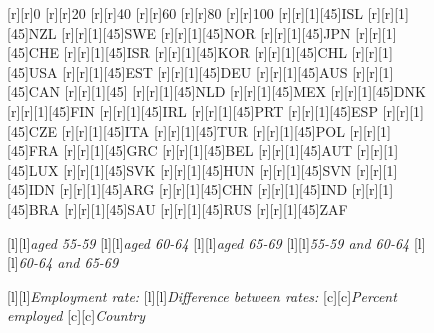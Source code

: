 \documentclass[11 pt, a4paper]{report}
\begin{document}
\begin{figure}[hbtp!]
[r][r]{\scriptsize{0}}
[r][r]{\scriptsize{20}}
[r][r]{\scriptsize{40}}
[r][r]{\scriptsize{60}}
[r][r]{\scriptsize{80}}
[r][r]{\scriptsize{100}}
[r][r][1][45]{\tiny{ISL}}
[r][r][1][45]{\tiny{NZL}}
[r][r][1][45]{\tiny{SWE}}
[r][r][1][45]{\tiny{NOR}}
[r][r][1][45]{\tiny{JPN}}
[r][r][1][45]{\tiny{CHE}}
[r][r][1][45]{\tiny{ISR}}
[r][r][1][45]{\tiny{KOR}}
[r][r][1][45]{\tiny{CHL}}
[r][r][1][45]{\tiny{USA}}
[r][r][1][45]{\tiny{EST}}
[r][r][1][45]{\tiny{DEU}}
[r][r][1][45]{\tiny{AUS}}
[r][r][1][45]{\tiny{CAN}}
[r][r][1][45]{\tiny{\color{red}{GBR}}}
[r][r][1][45]{\tiny{NLD}}
[r][r][1][45]{\tiny{MEX}}
[r][r][1][45]{\tiny{DNK}}
[r][r][1][45]{\tiny{FIN}}
[r][r][1][45]{\tiny{IRL}}
[r][r][1][45]{\tiny{PRT}}
[r][r][1][45]{\tiny{ESP}}
[r][r][1][45]{\tiny{CZE}}
[r][r][1][45]{\tiny{ITA}}
[r][r][1][45]{\tiny{TUR}}
[r][r][1][45]{\tiny{POL}}
[r][r][1][45]{\tiny{FRA}}
[r][r][1][45]{\tiny{GRC}}
[r][r][1][45]{\tiny{BEL}}
[r][r][1][45]{\tiny{AUT}}
[r][r][1][45]{\tiny{LUX}}
[r][r][1][45]{\tiny{SVK}}
[r][r][1][45]{\tiny{HUN}}
[r][r][1][45]{\tiny{SVN}}
[r][r][1][45]{\tiny{IDN}}
[r][r][1][45]{\tiny{ARG}}
[r][r][1][45]{\tiny{CHN}}
[r][r][1][45]{\tiny{IND}}
[r][r][1][45]{\tiny{BRA}}
[r][r][1][45]{\tiny{SAU}}
[r][r][1][45]{\tiny{RUS}}
[r][r][1][45]{\tiny{ZAF}}

[l][l]{\scriptsize{\emph{aged 55-59}}}
[l][l]{\scriptsize{\emph{aged 60-64}}}
[l][l]{\scriptsize{\emph{aged 65-69}}}
[l][l]{\scriptsize{\emph{55-59 and 60-64}}}
[l][l]{\scriptsize{\emph{60-64 and 65-69}}}

[l][l]{\scriptsize{\emph{Employment rate:}}}
[l][l]{\scriptsize{\emph{Difference between rates:}}}
[c][c]{\small{\emph{Percent employed}}}
[c][c]{\small{\emph{Country}}}
                           


\end{figure}
\end{document}
